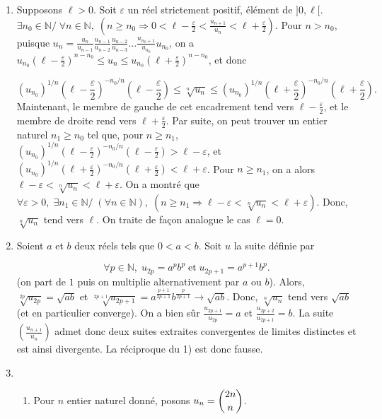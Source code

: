 \documentclass[11pt,a4paper]{article}
\newcommand{\Nn}{\mathbb{N}} \newcommand{\N}{\mathbb{N}}
\begin{document}
\begin{enumerate}
 \item  Supposons $\ell>0$. Soit $\varepsilon$ un réel strictement positif, élément de $]0,\ell[$.
$\exists n_0\in\Nn/\;\forall n\in\Nn,\;(n\geq n_0\Rightarrow0< \ell-\frac{\varepsilon}{2}<\frac{u_{n+1}}{u_n}<\ell+\frac{\varepsilon}{2})$.
Pour $n>n_0$, puisque $u_n=\frac{u_n}{u_{n-1}}\frac{u_{n-1}}{u_{n-2}}\frac{u_{n-2}}{u_{n-3}}...\frac{u_{n_0+1}}{u_{n_0}}u_{n_0}$, on a 
$u_{n_0}\left(\ell-\frac{\varepsilon}{2}\right)^{n-n_0}\leq  u_n\leq u_{n_0}\left(\ell+\frac{\varepsilon}{2}\right)^{n-n_0}$, et donc 

$$(u_{n_0})^{1/n}\left(\ell-\frac{\varepsilon}{2}\right)^{-n_0/n}\left(\ell-\frac{\varepsilon}{2}\right)\leq \sqrt[n]{u_n}\leq(u_{n_0})^{1/n}\left(\ell+\frac{\varepsilon}{2}\right)^{-n_0/n}\left(\ell+\frac{\varepsilon}{2}\right).$$
Maintenant, le membre de gauche de cet encadrement tend vers $\ell-\frac{\varepsilon}{2}$, et le membre de droite rend vers $\ell+\frac{\varepsilon}{2}$. Par suite, on peut trouver un entier naturel $n_1\geq n_0$ tel que, pour $n\geq n_1$, $(u_{n_0})^{1/n}\left(\ell-\frac{\varepsilon}{2}\right)^{-n_0/n}\left(\ell-\frac{\varepsilon}{2}\right)>\ell-\varepsilon$, et $(u_{n_0})^{1/n}\left(\ell+\frac{\varepsilon}{2}\right)^{-n_0/n}\left(\ell+\frac{\varepsilon}{2}\right)<\ell+\varepsilon$. Pour $n\geq n_1$, on a alors $\ell-\varepsilon<\sqrt[n]{u_n}<\ell+\varepsilon$.
On a montré que $\forall\varepsilon>0,\;\exists n_1\in\Nn/\;(\forall n\in\Nn),\;(n\geq n_1\Rightarrow\ell-\varepsilon<\sqrt[n]{u_n}<\ell+\varepsilon)$. Donc, $\sqrt[n]{u_n}$ tend vers $\ell$.
On traite de façon analogue le cas $\ell=0$.
 \item  Soient $a$ et $b$ deux réels tels que $0<a<b$. Soit $u$ la suite définie par 

$$\forall p\in\Nn,\;u_{2p}=a^pb^p\;\mbox{et}\;u_{2p+1}=a^{p+1}b^p.$$
(on part de $1$ puis on multiplie alternativement par $a$ ou $b$).
Alors, $\sqrt[2p]{u_{2p}}=\sqrt{ab}$ et $\sqrt[2p+1]{u_{2p+1}}=a^{\frac{p+1}{2p+1}}b^{\frac{p}{2p+1}}\rightarrow\sqrt{ab}$. Donc, $\sqrt[n]{u_n}$ tend vers $\sqrt{ab}$ (et en particulier converge).
On a bien sûr $\frac{u_{2p+1}}{u_{2p}}=a$ et $\frac{u_{2p+2}}{u_{2p+1}}=b$. La suite $\left(\frac{u_{n+1}}{u_n}\right)$ admet donc deux suites extraites convergentes de limites distinctes et est ainsi divergente. La réciproque du 1) est donc fausse.
 \item  
  \begin{enumerate}
  \item  Pour $n$ entier naturel donné, posons $u_n=\dbinom{2n}{n}$.
 

\end{enumerate}
\end{enumerate}
\end{document}
